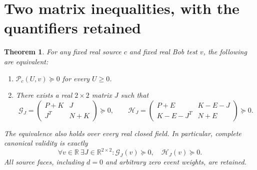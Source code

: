 \documentclass[11pt]{article}
\newtheorem{theorem}{Theorem}
\newcommand{\PSD}{\succeq0}
\newcommand{\R}{\mathbb R}
\begin{document}
\section{Two matrix inequalities, with the quantifiers retained}
\begin{theorem}\label{thm:selector}
For any fixed real source $c$ and fixed real Bob test $v$, the following are
equivalent:
\begin{enumerate}
\item $\mathcal P_c(U,v)\PSD$ for every $U\geq0$.
\item There exists a real $2\times2$ matrix $J$ such that
\begin{equation}
\boxed{\mathcal G_J=
\begin{pmatrix}P+K&J\\J^T&N+K\end{pmatrix}\PSD,
\qquad
\mathcal H_J=
\begin{pmatrix}P+E&K-E-J\\K-E-J^T&N+E\end{pmatrix}\PSD.}\label{lmis}
\end{equation}
\end{enumerate}
The equivalence also holds over every real closed field.  In particular,
complete canonical validity is exactly
\begin{equation}
\boxed{\forall v\in\R\ \exists J\in\R^{2\times2}:
\mathcal G_J(v)\PSD,\quad\mathcal H_J(v)\PSD.}\label{quantifiers}
\end{equation}
All source faces, including $d=0$ and arbitrary zero event weights, are retained.
\end{theorem}
\end{document}
